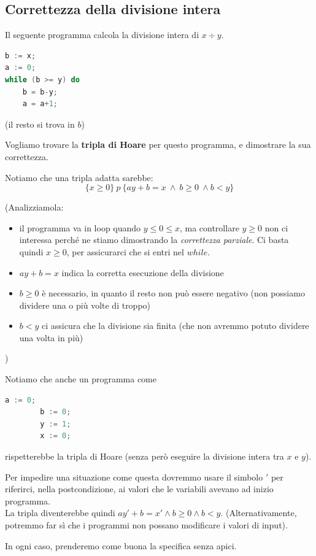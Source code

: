 \documentclass[a4paper,11pt]{report}
\begin{document}
\subsection{Correttezza della divisione intera}

Il seguente programma calcola la divisione intera di \( x \div y \).

\begin{lstlisting}[language=C]
b := x;
a := 0;
while (b >= y) do
    b = b-y;
    a = a+1;
\end{lstlisting}
(il resto si trova in \( b \))

Vogliamo trovare la \textbf{tripla di Hoare} per questo programma, e dimostrare la sua correttezza.

Notiamo che una tripla adatta sarebbe:
\[ \{x \geq 0\} \ p \ \{ay+b=x \ \land \ b\geq 0 \ \land b < y\} \]

(Analizziamola:
\begin{itemize}
    \item il programma va in loop quando \( y \leq 0 \leq x \), ma controllare \( y\geq 0 \) non ci interessa perché ne stiamo dimostrando la \textit{correttezza parziale}. Ci basta quindi \( x \geq 0 \), per assicurarci che si entri nel \( while \).
    \item \( ay + b = x \) indica la corretta esecuzione della divisione
    \item \( b \geq 0 \) è necessario, in quanto il resto non può essere negativo (non possiamo dividere una o più volte di troppo)
    \item \( b < y \) ci assicura che la divisione sia finita (che non avremmo potuto dividere una volta in più)
\end{itemize})

\begin{gframe}{}
    Notiamo che anche un programma come 
    \begin{lstlisting}[language=C]
        a := 0;
        b := 0;
        y := 1;
        x := 0;
    \end{lstlisting}
    rispetterebbe la tripla di Hoare (senza però eseguire la divisione intera tra \( x \) e \( y \)).
    
    Per impedire una situazione come questa dovremmo usare il simbolo \( ' \) per riferirci, nella postcondizione, ai valori che le variabili avevano ad inizio programma. 
    \\ La tripla diventerebbe quindi \( ay'+b=x' \land b\geq 0 \land b<y \).
    (Alternativamente, potremmo far sì che i programmi non possano modificare i valori di input).

    In ogni caso, prenderemo come buona la specifica senza apici.
\end{gframe}
\end{document}
